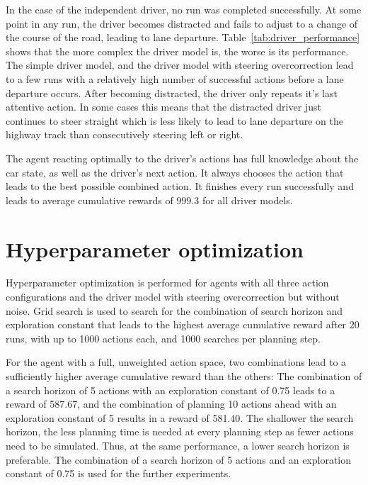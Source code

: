 In the case of the independent driver, no run was completed successfully. At some point in any run, the driver becomes distracted and fails to adjust to a change of the course of the road, leading to lane departure. Table~\ref{tab:driver_performance} shows that the more complex the driver model is, the worse is its performance. The simple driver model, and the driver model with steering overcorrection lead to a few runs with a relatively high number of successful actions before a lane departure occurs. After becoming distracted, the driver only repeats it's last attentive action. In some cases this means that the distracted driver just continues to steer straight which is less likely to lead to lane departure on the highway track than consecutively steering left or right.

The agent reacting optimally to the driver's actions has full knowledge about the car state, as well as the driver's next action. It always chooses the action that leads to the best possible combined action. It finishes every run successfully and leads to average cumulative rewards of $999.3$ for all driver models.



\section{Hyperparameter optimization}
\label{sec:grid_search}

Hyperparameter optimization is performed for agents with all three action configurations and the driver model with steering overcorrection but without noise. Grid search is used to search for the combination of search horizon and exploration constant that leads to the highest average cumulative reward after 20 runs, with up to 1000 actions each, and 1000 searches per planning step.



For the agent with a full, unweighted action space, two combinations lead to a sufficiently higher average cumulative reward than the others: The combination of a search horizon of 5 actions with an exploration constant of 0.75 leads to a reward of 587.67, and the combination of planning 10 actions ahead with an exploration constant of 5 results in a reward of 581.40. The shallower the search horizon, the less planning time is needed at every planning step as fewer actions need to be simulated. Thus, at the same performance, a lower search horizon is preferable. The combination of a search horizon of 5 actions and an exploration constant of 0.75 is used for the further experiments.

